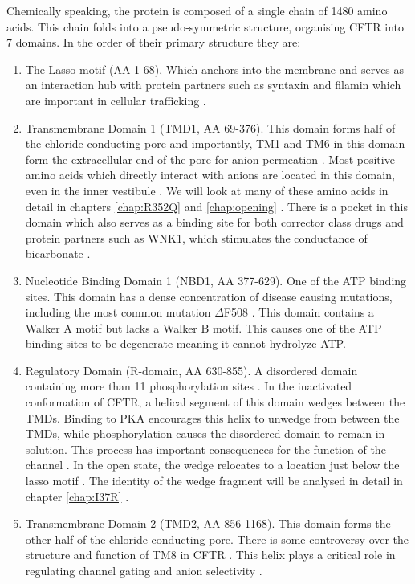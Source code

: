Chemically speaking, the protein is composed of a single chain of 1480 amino acids.  This chain folds into a pseudo-symmetric structure, organising CFTR into 7 domains. In the order of their primary structure they are: 

\begin{enumerate}
	\item The Lasso motif (AA 1-68), Which anchors into the membrane and serves as an interaction hub with protein partners such as syntaxin and filamin which are important in cellular trafficking \cite{cormet-boyaka2002, naren1998, thelin2007}. 
	\item Transmembrane Domain 1 (TMD1, AA 69-376). This domain forms half of the chloride conducting pore and importantly, TM1 and TM6 in this domain form the extracellular end of the pore for anion permeation \cite{linsdell2006, linsdell2022}. Most positive amino acids which directly interact with anions are located in this domain, even in the inner vestibule \cite{linsdell2018}. We will look at many of these amino acids in detail in chapters \ref{chap:R352Q} and \ref{chap:opening} \cite{wong2022a}. There is a pocket in this domain which also serves as a binding site for both corrector class drugs and protein partners such as WNK1, which stimulates the conductance of bicarbonate \cite{kim2019}. 
	\item Nucleotide Binding Domain 1 (NBD1, AA 377-629). One of the ATP binding sites. This domain has a dense concentration of disease causing mutations, including the most common mutation $\Delta$F508 \cite{cftr2}. This domain contains a Walker A motif but lacks a Walker B motif. This causes one of the ATP binding sites to be degenerate meaning it cannot hydrolyze ATP. 
	\item Regulatory Domain (R-domain, AA 630-855). A disordered domain containing more than 11 phosphorylation sites \cite{mihalyi2020}. In the inactivated conformation of CFTR, a helical segment of this domain wedges between the TMDs. Binding to PKA encourages this helix to unwedge from between the TMDs, while phosphorylation causes the disordered domain to remain in solution. This process has important consequences for the function of the channel \cite{ostedgaard2000, mihalyi2020, bozoky2013, baker2007}. In the open state, the wedge relocates to a location just below the lasso motif \cite{zhang2018}. The identity of the wedge fragment will be analysed in detail in chapter \ref{chap:I37R} \cite{wong2022}. 
	\item Transmembrane Domain 2 (TMD2, AA 856-1168). This domain forms the other half of the chloride conducting pore. There is some controversy over the structure and function of TM8 in CFTR \cite{hegedus2022, liu2019}. This helix plays a critical role in regulating channel gating and anion selectivity \cite{negoda2019}.

\end{enumerate}
